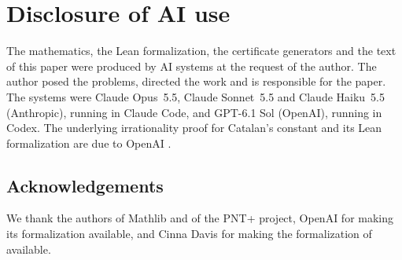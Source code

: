 \section*{Disclosure of AI use}
The mathematics, the Lean formalization, the certificate generators and the text of this paper were produced
by AI systems at the request of the author. The author posed the problems, directed the work and is
responsible for the paper. The systems were Claude Opus~5.5, Claude Sonnet~5.5 and Claude Haiku~5.5
(Anthropic), running in Claude Code, and GPT-6.1 Sol (OpenAI), running in Codex. The underlying
irrationality proof for Catalan's constant and its Lean formalization are due to OpenAI \cite{OpenAI2026}.

\subsection*{Acknowledgements}
We thank the authors of Mathlib and of the PNT+ project, OpenAI for making its formalization available, and
Cinna Davis for making the formalization of \cite{Davis2026} available.
